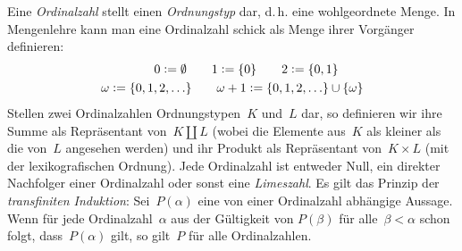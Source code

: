 \documentclass{uebblatt}
\begin{document}

\vspace{-1em}
\begin{tiny}
Eine \emph{Ordinalzahl} stellt einen \emph{Ordnungstyp} dar, d.\,h. eine
wohlgeordnete Menge. In Mengenlehre kann man eine Ordinalzahl schick als Menge
ihrer Vorgänger definieren:
\begin{align*}
  0 \vcentcolon= \emptyset \qquad
  1 \vcentcolon= \{ 0 \} \qquad
  2 \vcentcolon= \{ 0, 1 \} \qquad \\
  \omega \vcentcolon= \{ 0,1,2, \ldots \} \qquad
  \omega + 1 \vcentcolon= \{ 0,1,2, \ldots \} \cup \{\omega\}
\end{align*}
Stellen zwei Ordinalzahlen Ordnungstypen~$K$ und~$L$ dar, so definieren wir
ihre Summe als Repräsentant von~$K \amalg L$ (wobei die Elemente aus~$K$ als
kleiner als die von~$L$ angesehen werden) und ihr Produkt als Repräsentant
von~$K \times L$ (mit der lexikografischen Ordnung). Jede Ordinalzahl ist
entweder Null, ein direkter Nachfolger einer Ordinalzahl oder sonst eine
\emph{Limeszahl}. Es gilt das Prinzip der \emph{transfiniten Induktion}:
Sei~$P(\alpha)$ eine von einer Ordinalzahl abhängige Aussage. Wenn für jede
Ordinalzahl~$\alpha$ aus der Gültigkeit von $P(\beta)$ für alle~$\beta <
\alpha$ schon folgt, dass~$P(\alpha)$ gilt, so gilt~$P$ für alle
Ordinalzahlen.\par
\end{tiny}
\end{document}
